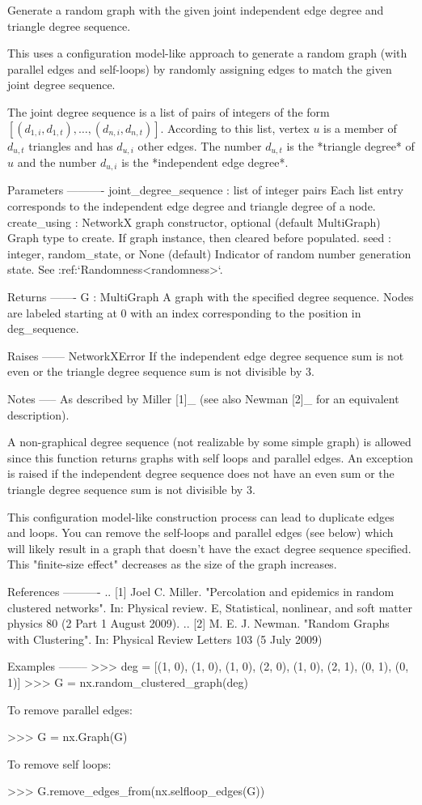 \begin{DoxyVerb}Generate a random graph with the given joint independent edge degree and
triangle degree sequence.

This uses a configuration model-like approach to generate a random graph
(with parallel edges and self-loops) by randomly assigning edges to match
the given joint degree sequence.

The joint degree sequence is a list of pairs of integers of the form
$[(d_{1,i}, d_{1,t}), \dotsc, (d_{n,i}, d_{n,t})]$. According to this list,
vertex $u$ is a member of $d_{u,t}$ triangles and has $d_{u, i}$ other
edges. The number $d_{u,t}$ is the *triangle degree* of $u$ and the number
$d_{u,i}$ is the *independent edge degree*.

Parameters
----------
joint_degree_sequence : list of integer pairs
    Each list entry corresponds to the independent edge degree and
    triangle degree of a node.
create_using : NetworkX graph constructor, optional (default MultiGraph)
   Graph type to create. If graph instance, then cleared before populated.
seed : integer, random_state, or None (default)
    Indicator of random number generation state.
    See :ref:`Randomness<randomness>`.

Returns
-------
G : MultiGraph
    A graph with the specified degree sequence. Nodes are labeled
    starting at 0 with an index corresponding to the position in
    deg_sequence.

Raises
------
NetworkXError
    If the independent edge degree sequence sum is not even
    or the triangle degree sequence sum is not divisible by 3.

Notes
-----
As described by Miller [1]_ (see also Newman [2]_ for an equivalent
description).

A non-graphical degree sequence (not realizable by some simple
graph) is allowed since this function returns graphs with self
loops and parallel edges.  An exception is raised if the
independent degree sequence does not have an even sum or the
triangle degree sequence sum is not divisible by 3.

This configuration model-like construction process can lead to
duplicate edges and loops.  You can remove the self-loops and
parallel edges (see below) which will likely result in a graph
that doesn't have the exact degree sequence specified.  This
"finite-size effect" decreases as the size of the graph increases.

References
----------
.. [1] Joel C. Miller. "Percolation and epidemics in random clustered
       networks". In: Physical review. E, Statistical, nonlinear, and soft
       matter physics 80 (2 Part 1 August 2009).
.. [2] M. E. J. Newman. "Random Graphs with Clustering".
       In: Physical Review Letters 103 (5 July 2009)

Examples
--------
>>> deg = [(1, 0), (1, 0), (1, 0), (2, 0), (1, 0), (2, 1), (0, 1), (0, 1)]
>>> G = nx.random_clustered_graph(deg)

To remove parallel edges:

>>> G = nx.Graph(G)

To remove self loops:

>>> G.remove_edges_from(nx.selfloop_edges(G))\end{DoxyVerb}
 